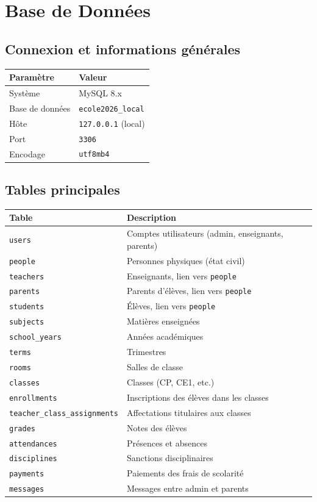 \documentclass[12pt,a4paper]{report}
\begin{document}
\chapter{Base de Données}

\section{Connexion et informations générales}

\begin{tabularx}{\textwidth}{lX}\toprule
\textbf{Paramètre} & \textbf{Valeur} \\\midrule
Système & MySQL 8.x \\
Base de données & \texttt{ecole2026\_local} \\
Hôte & \texttt{127.0.0.1} (local) \\
Port & \texttt{3306} \\
Encodage & \texttt{utf8mb4} \\
\bottomrule\end{tabularx}

\section{Tables principales}

\begin{tabularx}{\textwidth}{lX}\toprule
\textbf{Table} & \textbf{Description} \\\midrule
\texttt{users} & Comptes utilisateurs (admin, enseignants, parents) \\
\texttt{people} & Personnes physiques (état civil) \\
\texttt{teachers} & Enseignants, lien vers \texttt{people} \\
\texttt{parents} & Parents d'élèves, lien vers \texttt{people} \\
\texttt{students} & Élèves, lien vers \texttt{people} \\
\texttt{subjects} & Matières enseignées \\
\texttt{school\_years} & Années académiques \\
\texttt{terms} & Trimestres \\
\texttt{rooms} & Salles de classe \\
\texttt{classes} & Classes (CP, CE1, etc.) \\
\texttt{enrollments} & Inscriptions des élèves dans les classes \\
\texttt{teacher\_class\_assignments} & Affectations titulaires aux classes \\
\texttt{grades} & Notes des élèves \\
\texttt{attendances} & Présences et absences \\
\texttt{disciplines} & Sanctions disciplinaires \\
\texttt{payments} & Paiements des frais de scolarité \\
\texttt{messages} & Messages entre admin et parents \\
\bottomrule\end{tabularx}
\end{document}
